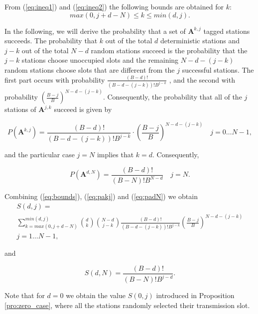 \documentclass[journal]{IEEEtran}
\begin{document}
From (\ref{eq:ineq1}) and (\ref{eq:ineq2}) the following bounds are obtained for $k$:
\begin{equation}
\label{eq:bounds}
max(0,j+d-N) \leq k \leq min(d,j).
\end{equation}

In the following, we will derive the probability that a set of $\mathbf{A}^{k,j}$ tagged stations succeeds.
The probability that $k$ out of the total $d$ deterministic stations and $j-k$ out of the total $N-d$ random stations succeed is the probability that the $j-k$ stations choose unoccupied slots and the remaining $N-d-(j-k)$random stations choose slots that are different from the $j$ successful stations.
The first part occurs with probability $\frac{(B-d)!}{\left(B-d-(j-k) \right)!B^{j-k}}$  , and the second with probability $\left(\frac{B-j}{B} \right)^{N-d-(j-k)}$.
Consequently, the probability that all of the $j$ stations of $\mathbf{A}^{j,k}$ succeed is given by

\begin{equation}
\label{eq:pakj}
P(\mathbf{A}^{k,j})=\frac{(B-d)!}{(B-d-(j-k))!B^{j-k}}\cdot \left( \frac{B-j}{B} \right)^{N-d-(j-k)}
\quad j=0\dots N-1,
\end{equation}

and the particular case $j=N$ implies that $k=d$.
Consequently,

\begin{equation}
\label{eq:padN}
P(\mathbf{A}^{d,N})=\frac{(B-d)!}{(B-N)!B^{N-d}}
\quad j= N.
\end{equation}

Combining (\ref{eq:bounds}), (\ref{eq:pakj}) and (\ref{eq:padN}) we obtain
\begin{equation}
\label{eq:sdj}
\begin{split}
S(d,j)= \\
\sum_{k=max(0,j+d-N)}^{min(d,j)} \binom{d}{k} \binom{N-d}{j-k} \frac{(B-d)!}{\left(B-d-(j-k)\right)!B^{j-k}} \left(\frac{B-j}{B} \right)^{N-d-(j-k)} \\
j=1 \dots N-1, 
\end{split}
\end{equation}

and

\begin{equation}
\label{eq:sdN}
S(d,N)= \frac{(B-d)!}{(B-N)!B^{j-d}}.
\end{equation}

Note that for $d=0$ we obtain the value $S(0,j)$ introduced in Proposition \ref{pro:zero_case}, where all the stations randomly selected their transmission slot.
\end{document}

